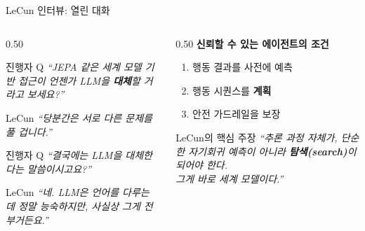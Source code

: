 \documentclass[aspectratio=169,10pt]{beamer}
\begin{document}
\begin{frame}{LeCun 인터뷰: 열린 대화}
\begin{columns}[T]
\begin{column}{0.50\textwidth}
\begin{block}{진행자 Q}
\textit{``JEPA 같은 세계 모델 기반 접근이 언젠가 LLM을 \textbf{대체}할 거라고 보세요?''}
\end{block}

\begin{block}{LeCun}
\textit{``당분간은 서로 다른 문제를 풀 겁니다.''}
\end{block}

\begin{block}{진행자 Q}
\textit{``결국에는 LLM을 대체한다는 말씀이시고요?''}
\end{block}

\begin{block}{LeCun}
\textit{``네. LLM은 언어를 다루는 데 정말 능숙하지만, 사실상 그게 전부거든요.''}
\end{block}
\end{column}
\begin{column}{0.50\textwidth}
\textbf{신뢰할 수 있는 에이전트의 조건}
\begin{enumerate}
  \item 행동 결과를 \alert{사전에 예측}
  \item 행동 시퀀스를 \textbf{계획}
  \item 안전 가드레일을 \alert{보장}
\end{enumerate}

\vspace{0.6em}
\begin{alertblock}{LeCun의 핵심 주장}
\textit{``추론 과정 자체가, 단순한 자기회귀 예측이 아니라 \textbf{탐색(search)}이 되어야 한다.\\
그게 바로 세계 모델이다.''}
\end{alertblock}
\end{column}
\end{columns}
\end{frame}
\end{document}
